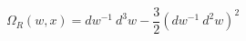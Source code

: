 \begin{equation}
\Omega_{R}(w,x) =dw^{-1}~d^{3}w -\frac{3}{2} (dw^{-1} ~d^{2}w)^{2}
\end{equation}

